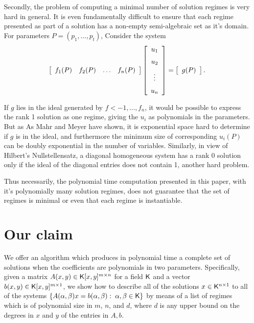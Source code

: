 \documentclass[10pt]{article}
\begin{document}
Secondly, the problem of computing a minimal number of solution regimes is 
very hard in general.  It is even fundamentally difficult to ensure that 
each regime presented as part of a solution has a non-empty semi-algebraic
set as it's domain.  
For parameters $ P = (p_1, \ldots, p_t)$, Consider the system
\[ 
\left [\begin {array}{cccc} 
    f_1(P)    & f_2(P)  & \ldots & f_n(P)
\end {array}\right ] 
\left [\begin {array}{c} 
    u_{1} \\\noalign{\medskip}
    u_{2} \\\noalign{\medskip}
    \vdots  \\\noalign{\medskip}
    u_{n} 
\end {array}\right ]
=
\left [\begin {array}{c} 
    g(P)
\end {array}\right ].
\]

If $g$ lies in the ideal generated by $f<-1, \ldots, f_n$, it would be possible
to express the rank 1 solution as one regime, giving the $u_i$ as polynomials
in the parameters.  But as 
As Mahr and Meyer \cite{MaMe} have shown, it is exponential space hard to determine if $g$ is in the ideal, and furthermore the minimum size of corresponding $u_i(P)$
can be doubly exponential in the number of variables.
Similarly, in view of Hilbert's Nullstellensatz, 
a diagonal homogeneous system has a rank 0 solution only if
the ideal of the diagonal entries does not contain 1, another hard problem.

Thus necessarily, the polynomial time computation 
presented in this paper, with it's polynomially many solution regimes, does
not guarantee that the set of regimes is minimal or even that each regime
is instantiable.

\newpage
\section{Our claim}

We offer an algorithm which produces in polynomial time a complete set
of solutions when the coefficients are polynomials in two parameters.
Specifically, given a matrix $A(x,y)\in{\mathsf K}[x,y]^{m\times n}$ for a field ${\mathsf K}$
and a vector $b(x,y)\in{\mathsf K}[x,y]^{m\times 1}$, we show how to describe all of
the solutions $x \in {\mathsf K}^{n\times 1}$ to all of the systems
$\{ A(\alpha, \beta)x = b(\alpha, \beta):\; \alpha,\beta\in{\mathsf K}\}$ 
by means of a list of regimes which is of polynomial size in $m$, $n$,
and $d$, where $d$ is any upper bound on the degrees in $x$ and $y$ of the entries in 
$A, b$.
  
\end{document}
